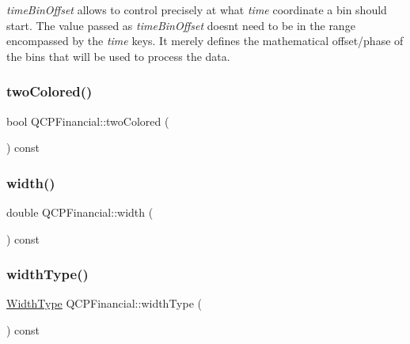 {\itshape time\+Bin\+Offset} allows to control precisely at what {\itshape time} coordinate a bin should start. The value passed as {\itshape time\+Bin\+Offset} doesn\textquotesingle{}t need to be in the range encompassed by the {\itshape time} keys. It merely defines the mathematical offset/phase of the bins that will be used to process the data. \mbox{\label{class_q_c_p_financial_afd4b51de5be8e53776b649f9877a50e6}} 
\subsubsection{\texorpdfstring{two\+Colored()}{twoColored()}}
{\footnotesize\ttfamily bool Q\+C\+P\+Financial\+::two\+Colored (\begin{DoxyParamCaption}{ }\end{DoxyParamCaption}) const\hspace{0.3cm}{\ttfamily [inline]}}

\mbox{\label{class_q_c_p_financial_a12548f13658eda5833204ef60f524870}} 
\subsubsection{\texorpdfstring{width()}{width()}}
{\footnotesize\ttfamily double Q\+C\+P\+Financial\+::width (\begin{DoxyParamCaption}{ }\end{DoxyParamCaption}) const\hspace{0.3cm}{\ttfamily [inline]}}

\mbox{\label{class_q_c_p_financial_a7afa595e63800c072701e6e57d4ca9e2}} 
\subsubsection{\texorpdfstring{width\+Type()}{widthType()}}
{\footnotesize\ttfamily \hyperlink{class_q_c_p_financial_aef1761dda71a53dc5269685e9e492626}{Width\+Type} Q\+C\+P\+Financial\+::width\+Type (\begin{DoxyParamCaption}{ }\end{DoxyParamCaption}) const\hspace{0.3cm}{\ttfamily [inline]}}



